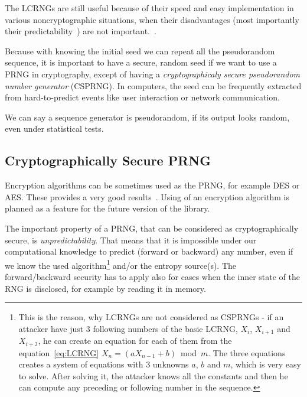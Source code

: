 \par{
The LCRNGs are still useful because of their speed and easy implementation 
in various noncryptographic situations, when their disadvantages 
(most importantly their predictability~\cite[p.~152, 153]
{CryptographyAndNetworkSecurity}) 
are not important.~\cite[chapter~16.1]{AppliedCryptography}. 
}

\par{
Because with knowing the initial seed we can repeat all the pseudorandom 
sequence, it is important to have a secure, random seed if we want to use 
a PRNG in cryptography, except of having a {\em cryptographicaly secure 
pseudorandom number generator} (CSPRNG). In computers, the seed 
can be frequently extracted from hard-to-predict events like user interaction 
or network communication.
}

\par{
We can say a sequence generator is pseudorandom, if its output looks random, 
even under statistical tests.
}

\subsection{Cryptographically Secure PRNG}
\par{
Encryption algorithms can be sometimes used as the PRNG,
 for example DES or AES. These provides a very good 
 results~\cite[p.~153-156]{CryptographyAndNetworkSecurity}. 
 Using of an encryption algorithm is planned as a feature for the future version 
 of the library.
}

\par{
The important property of a PRNG, that can be considered as cryptographically 
secure, is {\em unpredictability}. That means that it is impossible under our 
computational knowledge to predict (forward or backward) any number, even if 
we know the used algorithm\footnote{This is the reason, why LCRNGs are not 
considered as CSPRNGs - if an attacker have just 3 following numbers 
of the basic LCRNG, $X_{i}$, $X_{i+1}$ and $X_{i+2}$, he can create 
an equation for each of them from the equation~\ref{eq:LCRNG} 
$X_n = (aX_{n-1} + b)$~mod~$m$. The three equations creates a system 
of equations with 3 unknowns $a$, $b$ and $m$, which is very easy to solve. 
After solving it, the attacker knows all the constants and then he can compute 
any preceding or following number in the sequence.} and/or the entropy 
source(s). The forward/backward security has to apply also for cases when 
the inner state of the RNG is disclosed, for example by reading it in memory.
}


